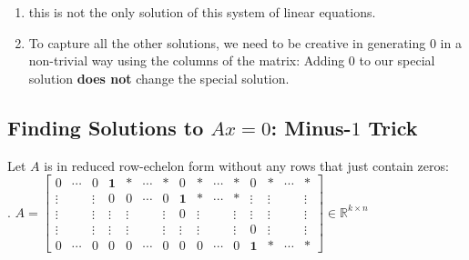 \begin{enumerate}
    \item this is not the only solution of this system of linear equations.
    \hfill \cite{mfml/book/mml/Deisenroth-Faisal-Ong}

    \item To capture all the other solutions, we need to be creative in generating $0$ in a non-trivial way using the columns of the matrix: Adding $0$ to our special solution \textbf{does not} change the special solution. 
    \hfill \cite{mfml/book/mml/Deisenroth-Faisal-Ong}

    
\end{enumerate}




\subsection{Finding Solutions to $Ax=0$: Minus-$1$ Trick \cite{mfml/book/mml/Deisenroth-Faisal-Ong}}

Let $A$ is in reduced row-echelon form without any rows that just contain zeros:\\
.\hfill
$
    A
    = 
    \begin{bmatrix}
        0 & \cdots & 0 & \mathbf{1} & * & \cdots & * & 0 & * & \cdots & * & 0 & * & \cdots & * \\
        \vdots & & \vdots & 0 & 0 & \cdots & 0 & \mathbf{1} & * & \cdots & * & \vdots & \vdots & & \vdots\\
        \vdots & & \vdots & \vdots & \vdots &  & \vdots & 0 & \vdots & & \vdots & \vdots & \vdots & & \vdots\\
        \vdots & & \vdots & \vdots & \vdots &  & \vdots & \vdots & \vdots & & \vdots & 0 & \vdots & & \vdots\\
        0 & \cdots & 0 & 0 & 0 & \cdots & 0 & 0 & 0 & \cdots & 0 & \mathbf{1} & * & \cdots & *
    \end{bmatrix}
    \in \mathbb{R}^{k\times n}
$
\hfill \cite{mfml/book/mml/Deisenroth-Faisal-Ong}

\vspace{0.2cm}

